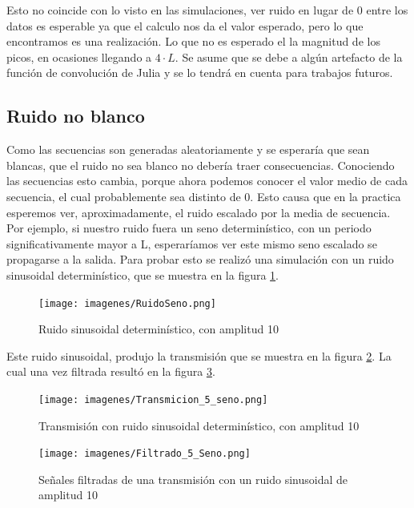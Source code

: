 \documentclass[12pt,letterpaper]{article}     %
\begin{document}
Esto no coincide con lo visto en las simulaciones, ver ruido en lugar de 0 entre los datos es esperable
ya que el calculo nos da el valor esperado, pero lo que encontramos es una realización. Lo que no es
esperado el la magnitud de los picos, en ocasiones llegando a $4\cdot L$. Se asume que se debe a algún
artefacto de la función de convolución de Julia y se lo tendrá en cuenta para trabajos futuros.

\subsection{Ruido no blanco}

Como las secuencias son generadas aleatoriamente y se esperaría que sean blancas, que el 
ruido no sea blanco no debería traer consecuencias. 
Conociendo las secuencias esto cambia, porque ahora podemos conocer el valor medio de cada secuencia,
el cual probablemente sea distinto de 0. Esto causa que en la practica esperemos ver, aproximadamente,
el ruido escalado por la media de secuencia. Por ejemplo, si nuestro ruido fuera un seno determinístico,
con un periodo significativamente mayor a L, esperaríamos ver este mismo seno escalado se propagarse a la
salida. Para probar esto se realizó una simulación con un ruido sinusoidal determinístico, que se muestra
en la figura \ref{fig:seno}.

\begin{figure}[!ht]
\centering
\texttt{[image: imagenes/RuidoSeno.png]}
\caption{Ruido sinusoidal determinístico, con amplitud 10}
\label{fig:seno}
\end{figure}

Este ruido sinusoidal, produjo la transmisión que se muestra en la figura \ref{fig:TransSeno}.
La cual una vez filtrada resultó en la figura \ref{fig:FiltSeno}.

\begin{figure}[!ht]
\centering
\texttt{[image: imagenes/Transmicion\_5\_seno.png]}
\caption{Transmisión con ruido sinusoidal determinístico, con amplitud 10}
\label{fig:TransSeno}
\end{figure}

\begin{figure}[!ht]
\centering
\texttt{[image: imagenes/Filtrado\_5\_Seno.png]}
\caption{Señales filtradas de una transmisión con un ruido sinusoidal de amplitud 10}
\label{fig:FiltSeno}
\end{figure}
\end{document}
